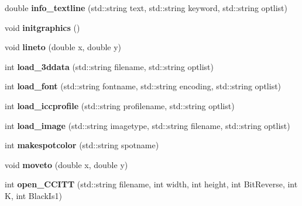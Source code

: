 \begin{DoxyCompactItemize}
\item 
\hypertarget{classPDFlib_a5ae97dc66793508bab806074eb3aaf8e}{double {\bfseries info\-\_\-textline} (std\-::string text, std\-::string keyword, std\-::string optlist)}\label{classPDFlib_a5ae97dc66793508bab806074eb3aaf8e}

\item 
\hypertarget{classPDFlib_abafce63a807f731025f6425f1cbf0702}{void {\bfseries initgraphics} ()}\label{classPDFlib_abafce63a807f731025f6425f1cbf0702}

\item 
\hypertarget{classPDFlib_a2b424210d5622820e27cf6f089003b06}{void {\bfseries lineto} (double x, double y)}\label{classPDFlib_a2b424210d5622820e27cf6f089003b06}

\item 
\hypertarget{classPDFlib_aea233d27c34fa1e9d60e9bc27278e27c}{int {\bfseries load\-\_\-3ddata} (std\-::string filename, std\-::string optlist)}\label{classPDFlib_aea233d27c34fa1e9d60e9bc27278e27c}

\item 
\hypertarget{classPDFlib_a7a3fb08e85e9adbe33b834c82d9a7546}{int {\bfseries load\-\_\-font} (std\-::string fontname, std\-::string encoding, std\-::string optlist)}\label{classPDFlib_a7a3fb08e85e9adbe33b834c82d9a7546}

\item 
\hypertarget{classPDFlib_a0e9a54de242086ebd19748c3ecf3a47d}{int {\bfseries load\-\_\-iccprofile} (std\-::string profilename, std\-::string optlist)}\label{classPDFlib_a0e9a54de242086ebd19748c3ecf3a47d}

\item 
\hypertarget{classPDFlib_a6d69dea52622a7af8d6231e1ada76139}{int {\bfseries load\-\_\-image} (std\-::string imagetype, std\-::string filename, std\-::string optlist)}\label{classPDFlib_a6d69dea52622a7af8d6231e1ada76139}

\item 
\hypertarget{classPDFlib_ad593e18f817501af814242eebe39902b}{int {\bfseries makespotcolor} (std\-::string spotname)}\label{classPDFlib_ad593e18f817501af814242eebe39902b}

\item 
\hypertarget{classPDFlib_a4b04a1be188fcb180132f2aa4f0a357c}{void {\bfseries moveto} (double x, double y)}\label{classPDFlib_a4b04a1be188fcb180132f2aa4f0a357c}

\item 
\hypertarget{classPDFlib_ad680c8f235044b05c2299f35facbe1a4}{int {\bfseries open\-\_\-\-C\-C\-I\-T\-T} (std\-::string filename, int width, int height, int \-Bit\-Reverse, int \-K, int \-Black\-Is1)}\label{classPDFlib_ad680c8f235044b05c2299f35facbe1a4}


\end{DoxyCompactItemize}
